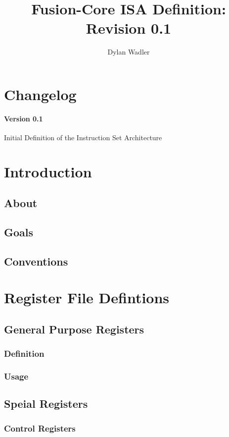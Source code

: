 \documentclass[letterpaper]{article}
\title{Fusion-Core ISA Definition: Revision 0.1}
\author{Dylan Wadler}
\begin{document}
\maketitle
\titleofcontents
\newpage
\section{Changelog}
\paragraph{Version 0.1} Initial Definition of the Instruction Set Architecture

\section{Introduction}
\subsection{About}
\subsection{Goals}
\subsection{Conventions}



\section{Register File Defintions}
\subsection{General Purpose Registers}
\subsubsection{Definition}
\subsubsection{Usage}
\subsection{Speial Registers}
\subsubsection{Control Registers}
\end{document}
